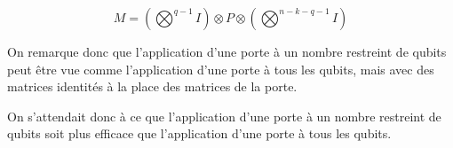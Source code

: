 $$M = \left(\bigotimes^{q-1} I\right) \otimes P \otimes \left(\bigotimes^{n-k-q-1} I\right)$$

On remarque donc que l'application d'une porte à un nombre restreint de qubits peut être vue comme l'application d'une porte à tous les qubits, mais avec des matrices identités à la place des matrices de la porte.

On s'attendait donc à ce que l'application d'une porte à un nombre restreint de qubits soit plus efficace que l'application d'une porte à tous les qubits.
